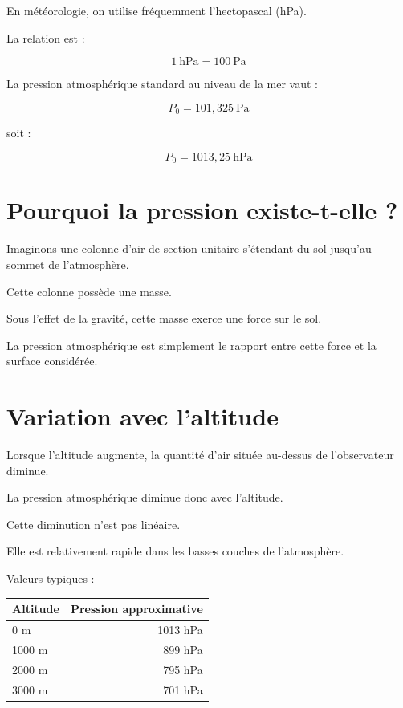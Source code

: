 En météorologie, on utilise fréquemment l'hectopascal (hPa).

La relation est :

\begin{equation}
1~\mathrm{hPa}=100~\mathrm{Pa}
\end{equation}

La pression atmosphérique standard au niveau de la mer vaut :

\begin{equation}
P_0 = 101,325~\mathrm{Pa}
\end{equation}

soit :

\begin{equation}
P_0 = 1013,25~\mathrm{hPa}
\end{equation}

\section{Pourquoi la pression existe-t-elle ?}

Imaginons une colonne d'air de section unitaire s'étendant du sol jusqu'au
sommet de l'atmosphère.

Cette colonne possède une masse.

Sous l'effet de la gravité, cette masse exerce une force sur le sol.

La pression atmosphérique est simplement le rapport entre cette force et la
surface considérée.

\section{Variation avec l'altitude}

Lorsque l'altitude augmente, la quantité d'air située au-dessus de
l'observateur diminue.

La pression atmosphérique diminue donc avec l'altitude.

Cette diminution n'est pas linéaire.

Elle est relativement rapide dans les basses couches de l'atmosphère.

\begin{exemple}

Valeurs typiques :

\begin{center}
\begin{tabular}{lr}
\toprule
Altitude & Pression approximative \\
\midrule
0 m & 1013 hPa \\
1000 m & 899 hPa \\
2000 m & 795 hPa \\
3000 m & 701 hPa \\
\bottomrule
\end{tabular}
\end{center}

\end{exemple}

